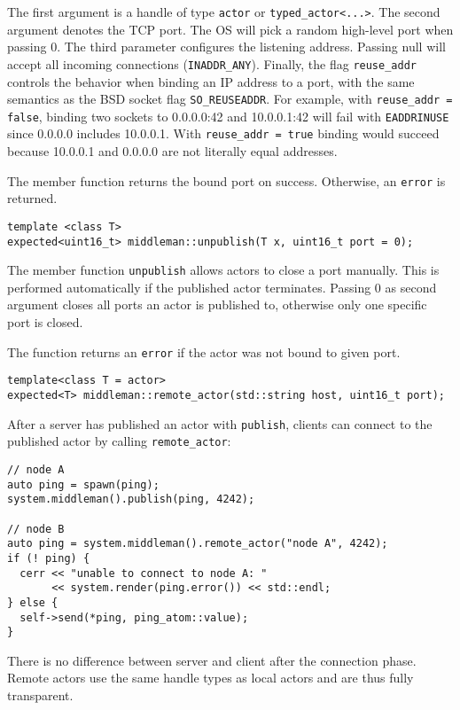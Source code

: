 The first argument is a handle of type \lstinline^actor^ or \lstinline^typed_actor<...>^. The second argument denotes the TCP port. The OS will pick a random high-level port when passing 0. The third parameter configures the listening address. Passing null will accept all incoming connections (\lstinline^INADDR_ANY^). Finally, the flag \lstinline^reuse_addr^ controls the behavior when binding an IP address to a port, with the same semantics as the BSD socket flag \lstinline^SO_REUSEADDR^.
For example, with \lstinline^reuse_addr = false^, binding two sockets to 0.0.0.0:42 and 10.0.0.1:42 will fail with \texttt{EADDRINUSE} since 0.0.0.0 includes 10.0.0.1. 
With \lstinline^reuse_addr = true^ binding would succeed because 10.0.0.1 and
0.0.0.0 are not literally equal addresses.

The member function returns the bound port on success. Otherwise, an \lstinline^error^  is returned.

\begin{lstlisting}
template <class T>
expected<uint16_t> middleman::unpublish(T x, uint16_t port = 0);
\end{lstlisting}

The member function \lstinline^unpublish^ allows actors to close a port manually. This is performed automatically if the published actor terminates. Passing 0 as second argument closes all ports an actor is published to, otherwise only one specific port is closed.

The function returns an \lstinline^error^  if the actor was not bound to given port.

\clearpage
\begin{lstlisting}
template<class T = actor>
expected<T> middleman::remote_actor(std::string host, uint16_t port);
\end{lstlisting}

After a server has published an actor with \lstinline^publish^, clients can connect to the published actor by calling \lstinline^remote_actor^:

\begin{lstlisting}
// node A
auto ping = spawn(ping);
system.middleman().publish(ping, 4242);

// node B
auto ping = system.middleman().remote_actor("node A", 4242);
if (! ping) {
  cerr << "unable to connect to node A: "
       << system.render(ping.error()) << std::endl;
} else {
  self->send(*ping, ping_atom::value);
}
\end{lstlisting}

There is no difference between server and client after the connection phase. Remote actors use the same handle types as local actors and are thus fully transparent.
